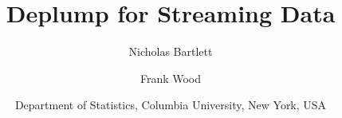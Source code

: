 \documentclass[oneside,letterpaper,12pt]{article}
\title{Deplump for Streaming Data}
\author{Nicholas Bartlett  \and Frank Wood}
\date{
\small Department of Statistics, Columbia University, New York, USA}
\begin{document}
\maketitle
\thispagestyle{empty}


%
%
%
%
%

%

%

%

%

%


\renewcommand{\bibsection}{\subsubsection*{References}}
\setlength{\bibsep}{0mm}

\end{document}
